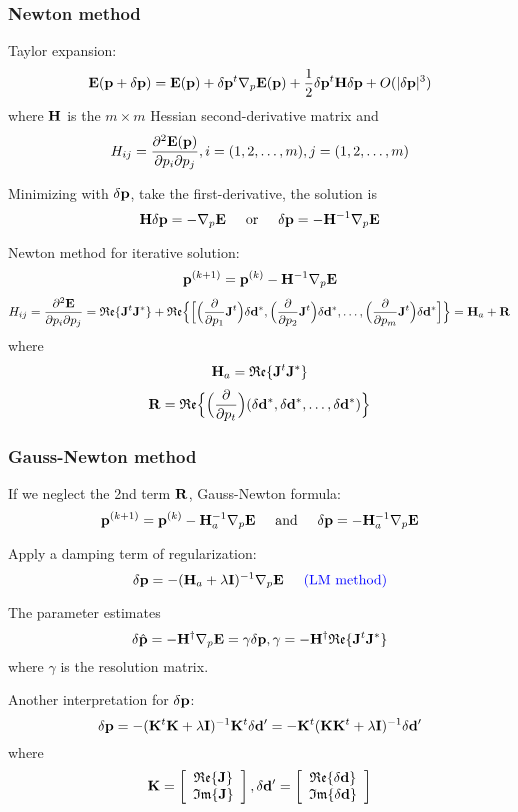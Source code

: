 \subsubsection{Newton method}
Taylor expansion:
\[ \mathbf{E}(\mathbf{p}+\delta\mathbf{p})=\mathbf{E}(\mathbf{p})+\delta\mathbf{p}^t\nabla_p\mathbf{E}(\mathbf{p})+\frac{1}{2}\delta\mathbf{p}^t\mathbf{H}\delta\mathbf{p}+O(|\delta\mathbf{p}|^3)  \]
where $\mathbf{H}$ is the $m\times m$ Hessian second-derivative matrix and
\[ H_{ij}=\frac{\partial^2\mathbf{E}(\mathbf{p})}{\partial p_i\partial p_j},i=(1,2,\ldots,m),j=(1,2,\ldots,m) \]\par
Minimizing with $\delta\mathbf{p}$, take the first-derivative, the solution is
\[ \mathbf{H}\delta\mathbf{p}=-\nabla_p\mathbf{E} \text{\hspace{5mm}or\hspace{5mm}} \delta\mathbf{p}=-\mathbf{H}^{-1}\nabla_p\mathbf{E} \]\par
Newton method for iterative solution:
\[ \mathbf{p}^{(k+1)}=\mathbf{p}^{(k)}-\mathbf{H}^{-1}\nabla_p\mathbf{E} \]
\[ H_{ij}=\frac{\partial^2\mathbf{E}}{\partial p_i\partial p_j}=\mathfrak{Re}\{\mathbf{J}^t\mathbf{J}^*\}+\mathfrak{Re}\Big\{\Big[\Big(\frac{\partial}{\partial p_1}\mathbf{J}^t\Big)\delta\mathbf{d}^*,\Big(\frac{\partial}{\partial p_2}\mathbf{J}^t\Big)\delta\mathbf{d}^*,\ldots,\Big(\frac{\partial}{\partial p_m}\mathbf{J}^t\Big)\delta\mathbf{d}^*\Big]\Big\}=\mathbf{H}_a+\mathbf{R} \]
where
\[ \mathbf{H}_a=\mathfrak{Re}\{\mathbf{J}^t\mathbf{J}^*\} \]
\[ \mathbf{R}=\mathfrak{Re}\Big\{\Big(\frac{\partial}{\partial p_t}\Big)(\delta\mathbf{d}^*,\delta\mathbf{d}^*,\ldots,\delta\mathbf{d}^*)\Big\} \]\par
\subsubsection{Gauss-Newton method}
If we neglect the 2nd term $\mathbf{R}$, Gauss-Newton formula:
\[ \mathbf{p}^{(k+1)}=\mathbf{p}^{(k)}-\mathbf{H}_a^{-1}\nabla_p\mathbf{E} \text{\hspace{5mm}and\hspace{5mm}} \delta\mathbf{p}=-\mathbf{H}_a^{-1}\nabla_p\mathbf{E} \]\par
Apply a damping term of regularization:
\[ \delta\mathbf{p}=-(\mathbf{H}_a+\lambda\mathbf{I})^{-1}\nabla_p\mathbf{E} \text{\hspace{5mm}{\color{blue}(LM method)}}\]\par
The parameter estimates
\[ \delta\hat{\mathbf{p}}=-\mathbf{H}^\dagger\nabla_p\mathbf{E}=\gamma\delta\mathbf{p},\gamma=-\mathbf{H}^\dagger\mathfrak{Re}\{\mathbf{J}^t\mathbf{J}^*\} \]
where $\gamma$ is the resolution matrix.\par
Another interpretation for $\delta\mathbf{p}$:
\[ \delta\mathbf{p}=-(\mathbf{K}^t\mathbf{K}+\lambda\mathbf{I})^{-1}\mathbf{K}^t\delta\mathbf{d}^\prime=-\mathbf{K}^t(\mathbf{K}\mathbf{K}^t+\lambda\mathbf{I})^{-1}\delta\mathbf{d}^\prime \]
where
\begin{equation*}
\mathbf{K}=\left[ \begin{array}{c}
\mathfrak{Re}\{\mathbf{J}\} \\
\mathfrak{Im}\{\mathbf{J}\}
\end{array}\right],
\delta\mathbf{d}^\prime=\left[ \begin{array}{c}
\mathfrak{Re}\{\delta\mathbf{d}\} \\
\mathfrak{Im}\{\delta\mathbf{d}\}
\end{array}\right]
\end{equation*}\par
